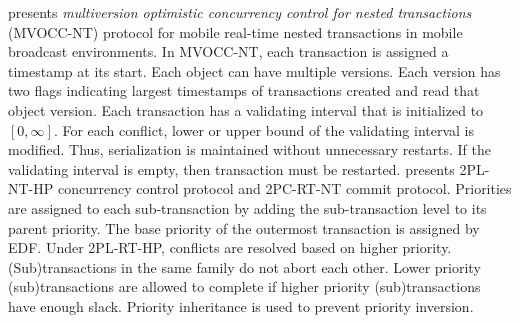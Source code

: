 \documentclass[letter]{sig-alternate}
\begin{document}
\cite{4709120} presents \textit{multiversion optimistic concurrency control for nested transactions} (MVOCC-NT) protocol for mobile real-time nested transactions in mobile broadcast environments. In MVOCC-NT, each transaction is assigned a timestamp at its start. Each object can have multiple versions. Each version has two flags indicating largest timestamps of transactions created and read that object version. 
Each transaction has a validating interval that is initialized to $[0,\infty]$. For each conflict, lower or upper bound of the validating interval is modified. Thus, serialization is maintained without unnecessary restarts. If the validating interval is empty, then transaction must be restarted. 
%
\cite{1420972} presents 2PL-NT-HP concurrency control protocol and 2PC-RT-NT commit protocol. %
Priorities are assigned to each sub-transaction by adding the sub-transaction level to its parent priority. The base priority of the outermost transaction is assigned by EDF. Under 2PL-RT-HP, conflicts are resolved based on higher priority. (Sub)transactions in the same family do not abort each other. Lower priority (sub)transactions are allowed to complete if higher priority (sub)transactions have enough slack. Priority inheritance is used to prevent priority inversion. 
\end{document}
